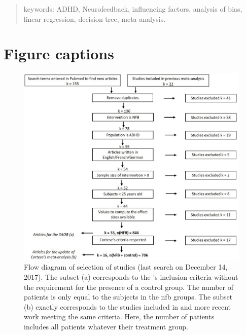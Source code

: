 \documentclass[12pt,a4paper,english]{article}
\begin{document}


\clearpage

\begin{abstract}

\vskip 0.2in
\noindent keywords: ADHD, Neurofeedback, influencing factors, analysis of bias, linear regression, decision tree, meta-analysis.
\end{abstract}









\clearpage



\clearpage

\section*{Figure captions}

\begin{figure}[h!]
  \centering
	\includegraphics[width=1.0\linewidth]{figures/meta_review_factors_analysis_how_studies_are_included_no_colors_2-columns_fitting_ima} 
  \caption{Flow diagram of selection of studies (last search on December 14, 2017).  
	The subset (a) corresponds to the \citeauthor{Cortese2016}'s inclusion criteria without the requirement for the presence of a control group. The number
	of patients is only equal to the subjects in the \gls{nfb} groups.
	The subset (b) exactly corresponds to the studies included in \citet{Cortese2016} and more recent work meeting the same criteria. Here, the number of patients includes all patients
	whatever their treatment group.}
  \label{Figure:systematic_review_workflow}
\end{figure}
\end{document}
